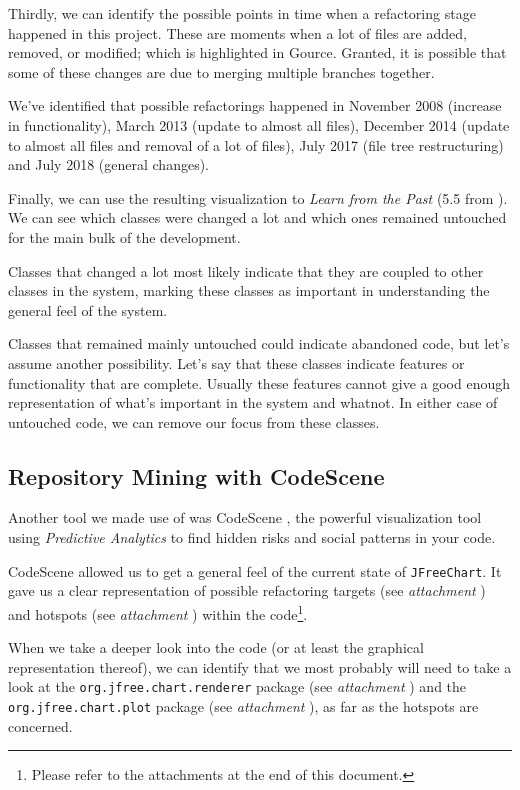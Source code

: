 \documentclass[11pt]{article}
\begin{document}
	Thirdly, we can identify the possible points in time when a refactoring stage happened in this project. These are moments when a lot of files are added, removed, or modified; which is highlighted in \textsf{Gource}. Granted, it is possible that some of these changes are due to merging multiple branches together.
	
	We've identified that possible refactorings happened in November 2008 (increase in functionality), March 2013 (update to almost all files), December 2014 (update to almost all files and removal of a lot of files), July 2017 (file tree restructuring) and July 2018 (general changes).
	
	Finally, we can use the resulting visualization to \textsl{Learn from the Past} (5.5 from \cite{demeyer2009object}). We can see which classes were changed a lot and which ones remained untouched for the main bulk of the development.
	
	Classes that changed a lot most likely indicate that they are coupled to other classes in the system, marking these classes as important in understanding the general feel of the system.
	
	Classes that remained mainly untouched could indicate abandoned code, but let's assume another possibility. Let's say that these classes indicate features or functionality that are complete. Usually these features cannot give a good enough representation of what's important in the system and whatnot. In either case of untouched code, we can remove our focus from these classes.
	
	\subsection{Repository Mining with CodeScene}
	\label{sec:codescene}
	Another tool we made use of was \textsf{CodeScene} \cite{codescene}, the powerful visualization tool using \textit{Predictive Analytics} to find hidden risks and social patterns in your code.
	
	\textsf{CodeScene} allowed us to get a general feel of the current state of \texttt{JFreeChart}. It gave us a clear representation of possible refactoring targets (see \textsl{attachment \pageref{refactoring-overview}}) and hotspots (see \textsl{attachment \pageref{hotspots-overview}}) within the code\footnote{Please refer to the attachments at the end of this document.}.
	
	When we take a deeper look into the code (or at least the graphical representation thereof), we can identify that we most probably will need to take a look at the \texttt{org.jfree.chart.renderer} package (see \textsl{attachment \pageref{hotspots-package-renderer}}) and the \texttt{org.jfree.chart.plot} package (see \textsl{attachment \pageref{hotspots-package-plot}}), as far as the hotspots are concerned.
	
\end{document}
